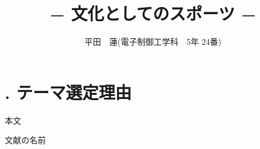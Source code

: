 \documentclass[twocolumn]{jarticle}
\title{\vspace{-4cm}{\fontsize{12pt}{12pt}\selectfont 運動・スポーツの文化的特徴}\\
{\fontsize{10.5pt}{10.5pt}\selectfont − 文化としてのスポーツ −}}
\author{{\fontsize{10.5pt}{10.5pt}\selectfont 平田　蓮(電子制御工学科　5年 24番)}}
\date{\empty}
\begin{document}
\maketitle
\section*{{\fontsize{11pt}{11pt}\selectfont {}. テーマ選定理由}}
{
    \fontsize{10.5pt}{10.5pt}\selectfont 本文
}


\begin{thebibliography}{9}
\fontsize{10.5pt}{10.5pt}\selectfont 
{} 文献の名前
\end{thebibliography}
\end{document}
